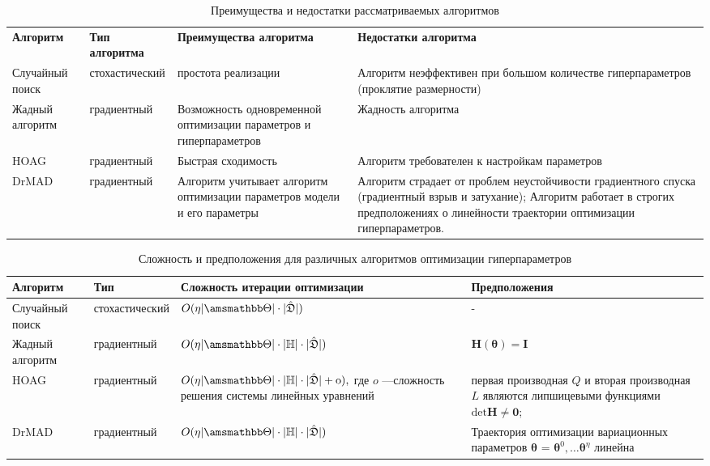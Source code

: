 \begin{table}[H]
\small

\begin{tabularx}{\textwidth}{|X|X|X|X|}
\hline
\bf Алгоритм & \bf Тип алгоритма & \bf Преимущества алгоритма & \bf Недостатки алгоритма  \\ 
Случайный поиск & стохастический & простота реализации& Алгоритм неэффективен при большом количестве гиперпараметров (проклятие размерности)  \\ \hline
Жадный алгоритм~\cite{greed_hyper} & градиентный & Возможность одновременной оптимизации параметров и гиперпараметров & Жадность алгоритма \\ \hline
HOAG~\cite{hyper_hoag} & градиентный & Быстрая сходимость & Алгоритм требователен к настройкам параметров \\ \hline 
DrMAD~\cite{hyper_mad} & градиентный & Алгоритм учитывает алгоритм оптимизации параметров модели и его параметры & Алгоритм страдает от проблем неустойчивости градиентного спуска (градиентный взрыв и затухание); Алгоритм работает в строгих предположениях о линейности траектории оптимизации гиперпараметров.\\ \hline
\end{tabularx}

\caption{Преимущества и недостатки рассматриваемых алгоритмов}
\label{table:algo_descr}

\end{table}


\begin{table}[H]
\small

\begin{tabularx}{\textwidth}{|X|X|X|X|}
\hline
\bf Алгоритм & \bf Тип & \bf Сложность итерации оптимизации & \bf Предположения \\ 
\hline
Случайный поиск & стохастический & $O(\eta |\Tetab|\cdot |\hat{\mathfrak{D}}|)$& -  \\ \hline
Жадный алгоритм~\cite{greed_hyper} & градиентный & $O(\eta |\Tetab|\cdot|\Hb|\cdot |\hat{\mathfrak{D}}|)$ & $\mathbf{H}(\boldsymbol{\theta}) = \mathbf{I}$  \\ \hline
HOAG~\cite{hyper_hoag} & градиентный & $O(\eta |\Tetab|\cdot|\Hb| \cdot |\hat{\mathfrak{D}}| + \text{o}),$ где $o$ ---сложность решения системы линейных уравнений& первая производная $Q$  и вторая производная $L$  являются липшицевыми функциями  $\text{det}\mathbf{H} \neq \mathbf{0}$;  \\ \hline
DrMAD~\cite{hyper_mad} & градиентный &$O(\eta |\Tetab|\cdot|\Hb| \cdot|\hat{\mathfrak{D}}|)$ & Траектория оптимизации вариационных параметров $\boldsymbol{\theta}$ = $\boldsymbol{\theta}^0, \dots \boldsymbol{\theta}^\eta$  линейна \\ \hline
\end{tabularx}

\caption{Сложность и предположения для различных алгоритмов оптимизации гиперпараметров}
\label{table:algo_descr2}

\end{table}






